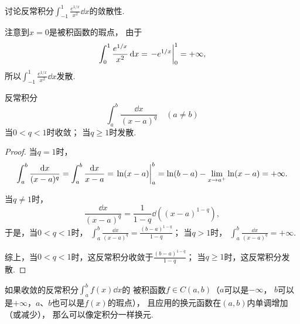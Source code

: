 \begin{example}
讨论反常积分\(\int_{-1}^1 \frac{e^{1/x}}{x^2} \dd{x}\)的敛散性.
\begin{solution}
注意到\(x=0\)是被积函数的瑕点，
由于\begin{equation*}
	\int_0^1 \frac{e^{1/x}}{x^2} \dd{x}
	= \eval{-e^{1/x}}_0^1
	= +\infty,
\end{equation*}
所以\(\int_{-1}^1 \frac{e^{1/x}}{x^2} \dd{x}\)发散.
\end{solution}
\end{example}

\begin{proposition}[\(q\)积分]\label{example:定积分.q积分}
反常积分\begin{equation*}
	\int_a^b \frac{\dd{x}}{(x-a)^q}
	\quad(a \neq b)
\end{equation*}
当\(0 < q < 1\)时收敛；
当\(q \geq 1\)时发散.
\begin{proof}
当\(q=1\)时，\begin{equation*}
	\int_a^b \frac{\dd{x}}{(x-a)^q}
	= \int_a^b \frac{\dd{x}}{x-a}
	= \eval{\ln(x-a)}_a^b
	= \ln(b-a) - \lim_{x \to a^+} \ln(x-a)
	= +\infty.
\end{equation*}

当\(q\neq1\)时，\begin{equation*}
	\frac{\dd{x}}{(x-a)^q}
	= \frac{1}{1-q} \dd((x-a)^{1-q}),
\end{equation*}
于是，当\(0<q<1\)时，
\(\int_a^b \frac{\dd{x}}{(x-a)^q}
= \frac{(b-a)^{1-q}}{1-q}\)；
当\(q>1\)时，
\(\int_a^b \frac{\dd{x}}{(x-a)^q}
= +\infty\).

综上，当\(0<q<1\)时，这反常积分收敛于\(\frac{(b-a)^{1-q}}{1-q}\)；
当\(q\geq1\)时，这反常积分发散.
\end{proof}
\end{proposition}

如果收敛的反常积分\(\int_a^b f(x) \dd{x}\)的
被积函数\(f \in C(a,b)\)（\(a\)可以是\(-\infty\)，
\(b\)可以是\(+\infty\)，\(a\)、\(b\)也可以是\(f(x)\)的瑕点），
且应用的换元函数在\((a,b)\)内单调增加（或减少），
那么可以像定积分一样换元.

